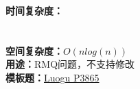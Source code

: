 \tiny {
\textbf{时间复杂度：}\\
\\
\\
\textbf{空间复杂度：}$O(nlog(n))$\\
\textbf{用途：}RMQ问题，不支持修改\\
\textbf{模板题：}\href{https://www.luogu.com.cn/problem/P3865}{Luogu P3865}
}